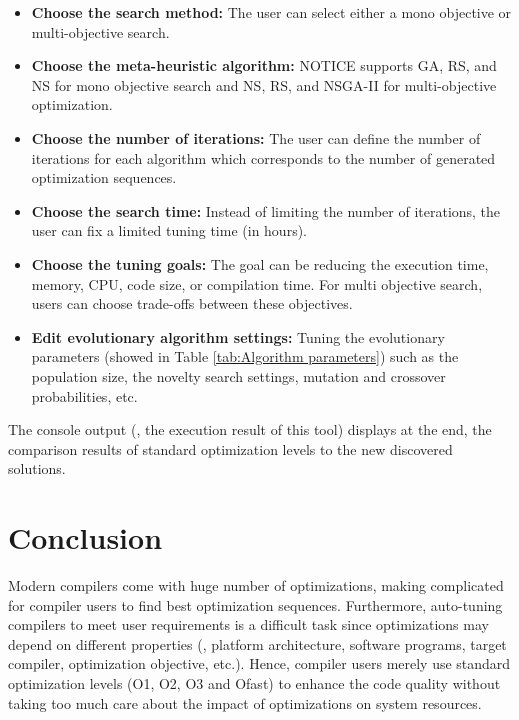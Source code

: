\begin{itemize}
	\item \textbf{Choose the search method:} The user can select either a mono objective or multi-objective search.
	
	\item \textbf{Choose the meta-heuristic algorithm:} NOTICE supports GA, RS, and NS for mono objective search and NS, RS, and NSGA-II for multi-objective optimization.
 	
	\item \textbf{Choose the number of iterations:} The user can define the number of iterations for each algorithm which corresponds to the number of generated optimization sequences.

	\item \textbf{Choose the search time:} Instead of limiting the number of iterations, the user can fix a limited tuning time (in hours). 
	
	\item \textbf{Choose the tuning goals:} The goal can be reducing the execution time, memory, CPU, code size, or compilation time. For multi objective search, users can choose trade-offs between these objectives.
	
	\item \textbf{Edit evolutionary algorithm settings:} Tuning the evolutionary parameters (showed in Table \ref{tab:Algorithm parameters}) such as the population size, the novelty search settings, mutation and crossover probabilities, etc.
\end{itemize} 


The console output (\ie, the execution result of this tool) displays at the end, the comparison results of standard optimization levels to the new discovered solutions.

\section{Conclusion}
\label{notice:conclusion}
Modern compilers come with huge number of optimizations, making complicated for compiler users to find best optimization sequences. Furthermore, auto-tuning compilers to meet user requirements is a difficult task since optimizations may depend on different properties (\eg, platform architecture, software programs, target compiler, optimization objective, etc.).
Hence, compiler users merely use standard optimization levels (O1, O2, O3 and Ofast) to enhance the code quality without taking too much care about the impact of optimizations on system resources.

